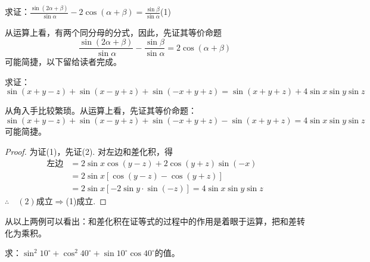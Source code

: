 \begin{example}
求证：$\frac{\sin(2\alpha+\beta)}{\sin\alpha}-2\cos(\alpha+\beta)=\frac{\sin\beta}{\sin\alpha}$\hfill(1)
\end{example}

\begin{analyze}
从运算上看，有两个同分母的分式，因此，先证其等价命题
\begin{equation}
    \frac{\sin(2\alpha+\beta)}{\sin\alpha}-\frac{\sin\beta}{\sin\alpha}=2\cos(\alpha+\beta) \tag{2}
\end{equation}
可能简捷，以下留给读者完成。
\end{analyze}

\begin{example}
求证：
\begin{equation}
\sin(x+y-z)+\sin(x-y+z)+\sin(-x+y+z)=\sin(x+y+z)+4\sin x\sin y\sin z\tag{1}
\end{equation}
\end{example}    

\begin{analyze}
从角入手比较繁琐。从运算上看，先证其等价命题：
\begin{equation}
 \sin(x+y-z)+\sin(x-y+z)+\sin(-x+y+z)-\sin(x+y+z)=4\sin x\sin y\sin z\tag{2}   
\end{equation}
可能简捷。
\end{analyze}

\begin{proof}
为证(1)，先证(2). 对左边和差化积，得
\[\begin{split}
\text{左边}&=2\sin x\cos(y-z)+2\cos(y+z)\sin(-x)\\
&=2\sin x[\cos(y-z)-\cos(y+z)]\\
&=2\sin x[-2\sin y\cdot \sin (-z)]=4\sin x\sin y\sin z
\end{split}\]    
$\therefore\quad (2)$成立$\Rightarrow$(1)成立.
\end{proof}

\begin{remark}
    从以上两例可以看出：和差化积在证等式的过程中的作用是着眼于运算，把和差转化为乘积。
\end{remark}

\begin{example}
    求：$\sin^2 10^{\circ} +\cos^2 40^{\circ} +\sin10^{\circ} \cos40^{\circ}$的值。
\end{example}

